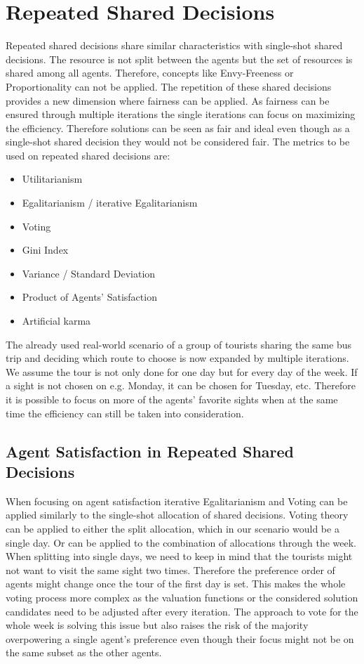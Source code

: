 \documentclass[german, a4paper, 11pt, oneside]{scrbook}
\begin{document}
\section{Repeated Shared Decisions}
Repeated shared decisions share similar characteristics with single-shot shared decisions. The resource is not split between the agents but the set of resources is shared among all agents. Therefore, concepts like Envy-Freeness or Proportionality can not be applied. The repetition of these shared decisions provides a new dimension where fairness can be applied. As fairness can be ensured through multiple iterations the single iterations can focus on maximizing the efficiency. Therefore solutions can be seen as fair and ideal even though as a single-shot shared decision they would not be considered fair. The metrics to be used on repeated shared decisions are: 
\begin{itemize}
  \item Utilitarianism
  \item Egalitarianism / iterative Egalitarianism
  \item Voting
\item Gini Index
\item Variance / Standard Deviation
\item Product of Agents' Satisfaction
\item Artificial karma
\end{itemize}
The already used real-world scenario of a group of tourists sharing the same bus trip and deciding which route to choose is now expanded by multiple iterations. We assume the tour is not only done for one day but for every day of the week. If a sight is not chosen on e.g. Monday, it can be chosen for Tuesday, etc. Therefore it is possible to focus on more of the agents' favorite sights when at the same time the efficiency can still be taken into consideration.
\subsection{Agent Satisfaction in Repeated Shared Decisions}
When focusing on agent satisfaction iterative Egalitarianism and Voting can be applied similarly to the single-shot allocation of shared decisions. Voting theory can be applied to either the split allocation, which in our scenario would be a single day. Or can be applied to the combination of allocations through the week. When splitting into single days, we need to keep in mind that the tourists might not want to visit the same sight two times. Therefore the preference order of agents might change once the tour of the first day is set. This makes the whole voting process more complex as the valuation functions or the considered solution candidates need to be adjusted after every iteration. The approach to vote for the whole week is solving this issue but also raises the risk of the majority overpowering a single agent's preference even though their focus might not be on the same subset as the other agents.
\end{document}

